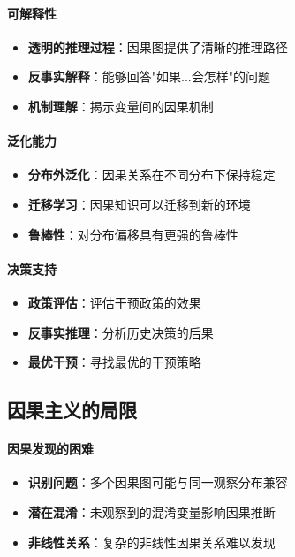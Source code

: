 \paragraph{可解释性}
\begin{itemize}
\item \textbf{透明的推理过程}：因果图提供了清晰的推理路径
\item \textbf{反事实解释}：能够回答"如果...会怎样"的问题
\item \textbf{机制理解}：揭示变量间的因果机制
\end{itemize}

\paragraph{泛化能力}
\begin{itemize}
\item \textbf{分布外泛化}：因果关系在不同分布下保持稳定
\item \textbf{迁移学习}：因果知识可以迁移到新的环境
\item \textbf{鲁棒性}：对分布偏移具有更强的鲁棒性
\end{itemize}

\paragraph{决策支持}
\begin{itemize}
\item \textbf{政策评估}：评估干预政策的效果
\item \textbf{反事实推理}：分析历史决策的后果
\item \textbf{最优干预}：寻找最优的干预策略
\end{itemize}

\subsection{因果主义的局限}

\paragraph{因果发现的困难}
\begin{itemize}
\item \textbf{识别问题}：多个因果图可能与同一观察分布兼容
\item \textbf{潜在混淆}：未观察到的混淆变量影响因果推断
\item \textbf{非线性关系}：复杂的非线性因果关系难以发现
\end{itemize}

